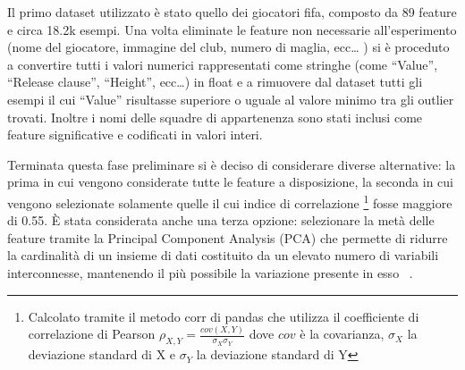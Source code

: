 \documentclass[12pt]{report}
\begin{document}
Il primo dataset utilizzato è stato quello dei giocatori fifa, composto da 89 feature e circa 18.2k esempi. 
Una volta eliminate le feature non necessarie all’esperimento (nome del giocatore, immagine del club, numero di maglia, ecc… ) si è proceduto a convertire tutti i valori numerici rappresentati come stringhe (come “Value”, “Release clause”, “Height”, ecc…) in float e a rimuovere dal dataset tutti gli esempi il cui “Value” risultasse superiore o uguale al valore minimo tra gli outlier trovati. Inoltre i nomi delle squadre di appartenenza sono stati inclusi come feature significative e codificati in valori interi.

Terminata questa fase preliminare si è deciso di considerare diverse alternative: la prima in cui vengono considerate tutte le feature a disposizione, la seconda in cui vengono selezionate solamente quelle il cui indice di correlazione \footnote{Calcolato tramite il metodo corr di pandas che utilizza il coefficiente di correlazione di Pearson $\rho_{X,Y} = \frac{cov(X, Y)}{\sigma_X\sigma_Y}$ dove $cov$ è la covarianza, $\sigma_X$ la deviazione standard di X e $\sigma_Y$ la deviazione standard di Y} fosse maggiore di 0.55.
È stata considerata anche una terza opzione: selezionare la metà delle feature tramite la Principal Component Analysis (PCA) che permette di ridurre la cardinalità di un insieme di dati costituito da un elevato numero di variabili interconnesse, mantenendo il più possibile la variazione presente in esso ~\cite{PCA}. 
\end{document}

